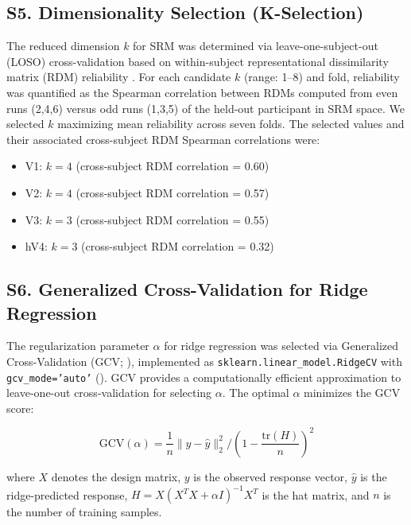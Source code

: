 
\subsection*{\textbf{S5. Dimensionality Selection (K-Selection)}}

The reduced dimension $k$ for SRM was determined via leave-one-subject-out (LOSO) cross-validation based on within-subject representational dissimilarity matrix (RDM) reliability \cite{cunningham2014}.
For each candidate $k$ (range: 1--8) and fold, reliability was quantified as the Spearman correlation between RDMs computed from even runs (2,4,6) versus odd runs (1,3,5) of the held-out participant in SRM space.
We selected $k$ maximizing mean reliability across seven folds.
The selected values and their associated cross-subject RDM Spearman correlations were:

\begin{itemize}
\item V1: $k = 4$ (cross-subject RDM correlation = 0.60)
\item V2: $k = 4$ (cross-subject RDM correlation = 0.57)
\item V3: $k = 3$ (cross-subject RDM correlation = 0.55)
\item hV4: $k = 3$ (cross-subject RDM correlation = 0.32)
\end{itemize}



\subsection*{\textbf{S6. Generalized Cross-Validation for Ridge Regression}}
\label{app:gcv}

The regularization parameter $\alpha$ for ridge regression was selected via Generalized Cross-Validation (GCV; ), implemented as \texttt{sklearn.linear\_model.RidgeCV} with \texttt{gcv\_mode='auto'} ().
GCV provides a computationally efficient approximation to leave-one-out cross-validation for selecting $\alpha$.
The optimal $\alpha$ minimizes the GCV score:

\begin{equation}
\text{GCV}(\alpha) = \frac{1}{n} \|y - \hat{y}\|_2^2 / \left(1 - \frac{\text{tr}(H)}{n}\right)^2
\end{equation}

where $X$ denotes the design matrix, $y$ is the observed response vector, $\hat{y}$ is the ridge-predicted response, $H = X(X^T X + \alpha I)^{-1}X^T$ is the hat matrix, and $n$ is the number of training samples.


